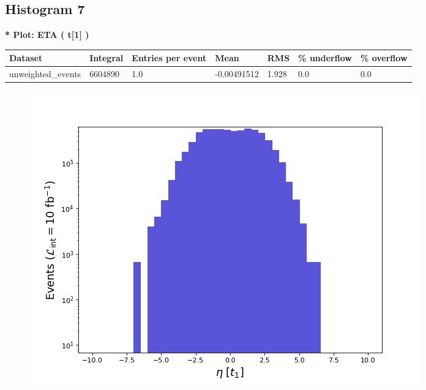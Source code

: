 \documentclass[a4paper, 10pt]{article}
\begin{document}
\subsection{ Histogram 7}

\textbf{* Plot: ETA ( t[1] ) }\\
   \begin{table}[H]
  \begin{center}
    \begin{tabular}{|m{23.0mm}|m{23.0mm}|m{18.0mm}|m{19.0mm}|m{19.0mm}|m{19.0mm}|m{19.0mm}|}
      \hline
      {\cellcolor{yellow}         Dataset}& {\cellcolor{yellow}         Integral}& {\cellcolor{yellow}         Entries per event}& {\cellcolor{yellow}         Mean}& {\cellcolor{yellow}         RMS}& {\cellcolor{yellow}         \% underflow}& {\cellcolor{yellow}         \% overflow}\\
      \hline
      {\cellcolor{white}         unweighted\_events}& {\cellcolor{white}         6604890}& {\cellcolor{white}         1.0}& {\cellcolor{white}         -0.00491512}& {\cellcolor{white}         1.928}& {\cellcolor{green}         0.0}& {\cellcolor{green}         0.0}\\
\hline
    \end{tabular}
  \end{center}
\end{table}

\begin{figure}[H]
  \begin{center}
    \includegraphics[scale=0.45]{selection_6.png}\\
\caption{   }
  \end{center}
\end{figure}
      \newpage
\end{document}
